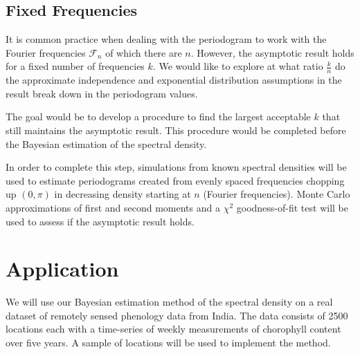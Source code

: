\documentclass{article}\usepackage[]{graphicx}\usepackage[]{color}
\newcommand{\mj}[1]{{\color{blue} #1}}
\theoremstyle{plain}
\begin{document}
\subsection*{Fixed Frequencies}
It is common practice when dealing with the periodogram to work with the Fourier frequencies $\mathcal{F}_n$ of which there are $n$. However, the asymptotic result \mj{holds for} a fixed number of frequencies $k$. We would like to explore at what ratio $\frac{k}{n}$ do the approximate independence and exponential distribution \mj{assumptions in the result} break down in the periodogram values.

The goal would be to develop a procedure to find the largest acceptable $k$ that still maintains \mj{the asymptotic result}. This procedure would be completed before the Bayesian estimation of the spectral density.

In order to complete this step, \mj{simulations from known spectral densities will be used to estimate} periodograms created from evenly spaced frequencies chopping up $(0,\pi)$ in decreasing density starting at $n$ (Fourier frequencies). \mj{Monte Carlo approximations of first and second moments and a} $\chi^2$ goodness-of-fit test will be used to \mj{assess} if the \mj{asymptotic result holds}. 

\section*{Application}
We will use our Bayesian estimation method of the spectral density on a real dataset \mj{of remotely sensed phenology data from India. The data consists of 2500 locations each with a time-series of weekly measurements of chorophyll content over five years. A sample of locations will be used to implement the method.}

\printbibliography
\end{document}
